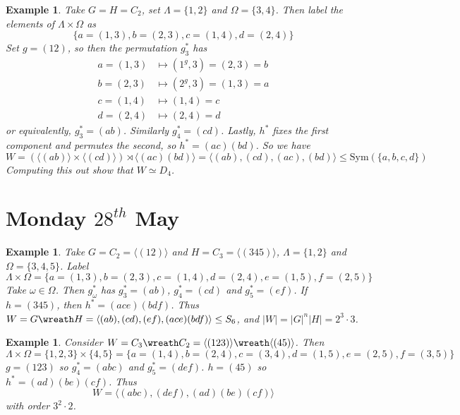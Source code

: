 \documentclass[a4paper,10pt]{article}
\newtheorem{eg}[thm]{Example}
\begin{document}
\begin{eg}
Take $G = H = C_2$, set $\Lambda = \{ 1, 2 \}$ and $\Omega = \{ 3, 4 \}$. Then label the elements of $\Lambda \times \Omega$ as
\[ \{ a = (1,3), b = (2, 3), c = (1, 4), d = (2,4) \} \]
Set $g = (12)$, so then the permutation $g^*_3$ has
\begin{align*}
a = (1,3) &\mapsto (1^g, 3) = (2,3) = b \\
b = (2,3) &\mapsto (2^g, 3) = (1,3) = a\\
c = (1,4) &\mapsto (1, 4) = c \\
d = (2,4) &\mapsto (2, 4) = d
\end{align*}
or equivalently, $g^*_3 = (ab)$. Similarly $g^*_4 = (cd)$. Lastly, $h^*$ fixes the first component and permutes the second, so $h^* = (ac)(bd)$. So we have
\[ W = (\langle (ab) \rangle \times \langle (cd) \rangle ) \rtimes \langle (ac)(bd) \rangle = \langle (ab), (cd), (ac), (bd) \rangle \leq \text{Sym}(\{ a,b,c,d\}) \]
Computing this out show that $W \simeq D_4$.
\end{eg}


\newpage
\section{Monday $28^{th}$ May}

\begin{eg}
Take $G = C_2 = \langle (12) \rangle$ and $H = C_3 = \langle (345) \rangle$, $\Lambda = \{ 1,2 \}$ and $\Omega = \{ 3, 4, 5\}$. Label
\[ \Lambda \times \Omega = \{ a = (1,3), b = (2,3), c = (1,4), d = (2,4), e = (1,5), f = (2,5) \} \]
Take $\omega \in \Omega$. Then $g_\omega^*$ has $g_3^* = (ab)$, $g_4^* = (cd)$ and $g_5^* = (ef)$. If $h = (345)$, then $h^* = (ace)(bdf)$. Thus $W = G \wreath H = \langle (ab), (cd), (ef), (ace)(bdf) \rangle  \leq S_6$, and $|W| = |G|^n |H| = 2^3 \cdot 3$.
\end{eg}

\begin{eg}
Consider $W = C_3 \wreath C_2 = \langle (123) \rangle \wreath \langle (45) \rangle$. Then 
\[ \Lambda \times \Omega = \{ 1,2,3 \} \times \{4,5\} = \{ a = (1,4), b = (2,4), c = (3,4), d = (1,5), e = (2,5), f = (3,5) \} \]
$g = (123)$ so $g_4^* = (abc)$ and $g_5^* = (def)$. $h = (45)$ so $h^* = (ad)(be)(cf)$.  Thus
\[ W = \langle (abc), (def), (ad)(be)(cf) \rangle \]
with order $3^2 \cdot 2$.
\end{eg}
\end{document}
